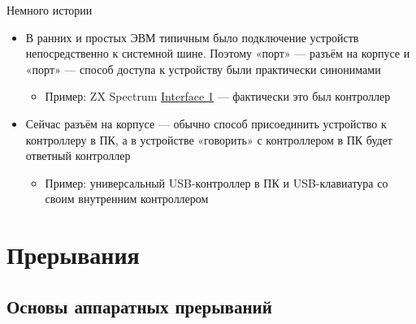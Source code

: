 \documentclass[xetex,aspectratio=43]{beamer}
\begin{document}
\begin{frame}{Немного истории}
	\begin{itemize}
		\tightlist
		\item
		В ранних и простых ЭВМ типичным было подключение устройств
		непосредственно к системной шине. Поэтому «порт» --- разъём на корпусе
		и «порт» --- способ доступа к устройству были практически синонимами

		\begin{itemize}
			\tightlist
			\item
			Пример: ZX Spectrum
			\href{https://en.wikipedia.org/wiki/ZX_Interface_1}{Interface 1} ---
			фактически это был контроллер
		\end{itemize}
		\item
		Сейчас разъём на корпусе --- обычно способ присоединить устройство к
		контроллеру в ПК, а в устройстве «говорить» с контроллером в ПК будет
		ответный контроллер

		\begin{itemize}
			\tightlist
			\item
			Пример: универсальный USB-контроллер в ПК и USB-клавиатура со своим
			внутренним контроллером
		\end{itemize}
	\end{itemize}
\end{frame}


\section{Прерывания}

\subsection{Основы аппаратных прерываний}
\end{document}
